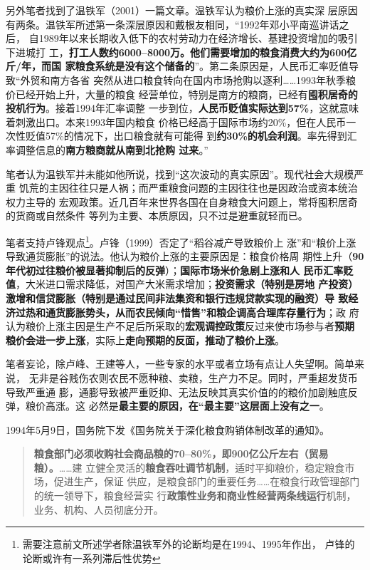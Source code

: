 另外笔者找到了温铁军（2001）一篇文章\cite{6cibodong}。温铁军认为粮价上涨的真实深
层原因有两条。温铁军所述第一条深层原因和戴根友相同，“1992年邓小平南巡讲话之后，
自1989年以来长期收入低下的农村劳动力在经济增长、基建投资增加的吸引下进城打
工，\textbf{打工人数约6000--8000万。他们需要增加的粮食消费大约为600亿斤/年，而国
  家粮食系统是没有这个储备的}”。第二条原因是，人民币汇率贬值导致“外贸和南方各省
突然从进口粮食转向在国内市场抢购以逐利……1993年秋季粮价已经开始上升，大量的粮食
经营单位，特别是南方的粮商，已经有\textbf{囤积居奇的投机行为}。接着1994年汇率调整
一步到位，\textbf{人民币贬值实际达到57\%}，这就意味着刺激出口。本来1993年国内粮食
价格已经高于国际市场约20\%，但在人民币一次性贬值57\%的情况下，出口粮食就有可能得
到\textbf{约30\%的机会利润}。率先得到汇率调整信息的\textbf{南方粮商就从南到北抢购
  过来}。”

笔者认为温铁军并未能如他所说，找到“这次波动的真实原因”。现代社会大规模严重
饥荒的主因往往只是人祸；而严重粮食问题的主因往往也是因政治或资本统治权力主导的
宏观政策。近几百年来世界各国在自身粮食大问题上，常将囤积居奇的货商或自然条件
等列为主要、本质原因，只不过是避重就轻而已。

笔者支持卢锋观点\footnote{需要注意前文所述学者除温铁军外的论断均是在1994、1995年作出，
  卢锋的论断或许有一系列滞后性优势}。卢锋（1999）否定了“稻谷减产导致粮价上
涨”和“粮价上涨导致通货膨胀”的说法。他认为粮价上涨的主要原因是：粮食价格周
期性上升（\textbf{90年代初过往粮价被显著抑制后的反弹}）；\textbf{国际市场米价急剧上涨和人
  民币汇率贬值}，大米进口需求降低，对国产大米需求增加；\textbf{投资需求（特别是房地
  产投资）激增和信贷膨胀（特别是通过民间非法集资和银行违规贷款实现的融资）导
  致经济过热和通货膨胀势头，从而农民倾向“惜售”和粮企调高合理库存量行为}；政
府认为粮价上涨主因是生产不足后所采取的\textbf{宏观调控政策}反过来使市场参与者\textbf{预期
  粮价会进一步上涨}，实际上\textbf{走向预期的反面，推动了粮价上涨}。

笔者妄论，除卢峰、王建等人，一些专家的水平或者立场有点让人失望啊。简单来说，
无非是谷贱伤农则农民不愿种粮、卖粮，生产力不足。同时，严重超发货币导致严重通
膨，通膨导致被严重贬抑、无法反映其真实价值的的粮价加剧触底反弹，粮价高涨。这
必然是\textbf{最主要的原因，在“最主要”这层面上没有之一}。

1994年5月9日，国务院下发《国务院关于深化粮食购销体制改革的通知》。
\begin{quotation}
  \textbf{粮食部门必须收购社会商品粮的70--80\%，即900亿公斤左右（贸易粮）。}……建
  立健全灵活的\textbf{粮食吞吐调节机制}，适时平抑粮价，稳定粮食市场，促进生产，保证
  供应，是粮食部门的重要任务……在粮食行政管理部门的统一领导下，粮食经营实
  行\textbf{政策性业务和商业性经营两条线运行}机制，业务、机构、人员彻底分开。
\end{quotation}

